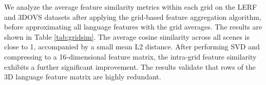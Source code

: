 \documentclass[runningheads]{llncs}
\begin{document}
We analyze the average feature similarity metrics within each grid on the LERF\cite{lerf2023} and 3DOVS\cite{liu2023weakly} datasets after applying the grid‑based feature aggregation algorithm, before approximating all language features with the grid averages. The results are shown in Table \ref{tab:gridsim}. The average cosine similarity across all scenes is close to 1, accompanied by a small mean L2 distance. After performing SVD and compressing to a 16‑dimensional feature matrix, the intra‑grid feature similarity exhibits a further significant improvement. The results validate that rows of the 3D language feature matrix are highly redundant.
\end{document}
